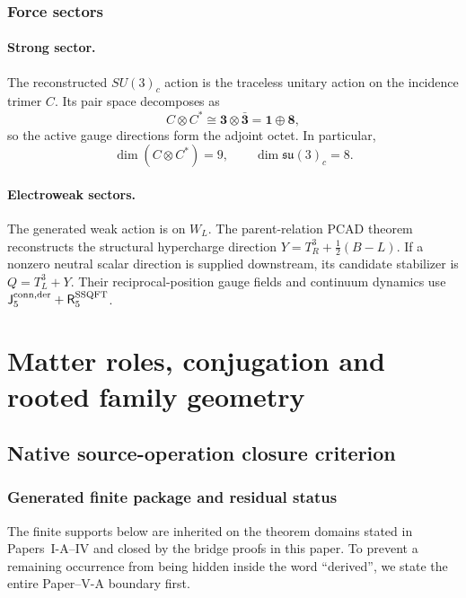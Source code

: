 \documentclass[12pt,a4paper]{article}
\begin{document}
\subsubsection{Force sectors}
\label{p5:sec:part1-forces}

\paragraph{Strong sector.}
\label{p5:sec:part1-strong}
The reconstructed \(SU(3)_c\) action is the traceless unitary action on the
incidence trimer \(C\).  Its pair space decomposes as
\begin{equation}
\label{p5:eq:part1-color-pair-space}
C\otimes C^\ast\cong\mathbf3\otimes\bar{\mathbf3}=\mathbf1\oplus\mathbf8,
\end{equation}
so the active gauge directions form the adjoint octet.  In particular,
\begin{equation}
\label{p5:eq:part1-color-89}
\dim(C\otimes C^\ast)=9,
\qquad
\dim\mathfrak{su}(3)_c=8.
\end{equation}

\paragraph{Electroweak sectors.}
\label{p5:sec:part1-weak}
\label{p5:sec:part1-hypercharge-force}
\label{p5:sec:part1-em}
The generated weak action is on \(W_L\).  The parent-relation PCAD theorem
reconstructs the structural hypercharge direction
\(Y=T_R^3+\tfrac12(B-L)\).  If a nonzero neutral scalar direction is
supplied downstream, its candidate stabilizer is
\(Q=T_L^3+Y\).  Their reciprocal-position gauge fields and continuum
dynamics use \(\mathsf J_5^{\rm conn,der}+\mathsf R_5^{\rm SSQFT}\).


\section{Matter roles, conjugation and rooted family geometry}
\label{p5a:sec:organized-family}
\subsection{Native source-operation closure criterion}
\label{p5:sec:part1-scope}

\subsubsection{Generated finite package and residual status}
The finite supports below are inherited on the theorem domains stated in
Papers~I-A--IV and closed by the bridge proofs in this paper.  To prevent a
remaining occurrence from being hidden inside the word ``derived'', we state
the entire Paper--V-A boundary first.
\end{document}
